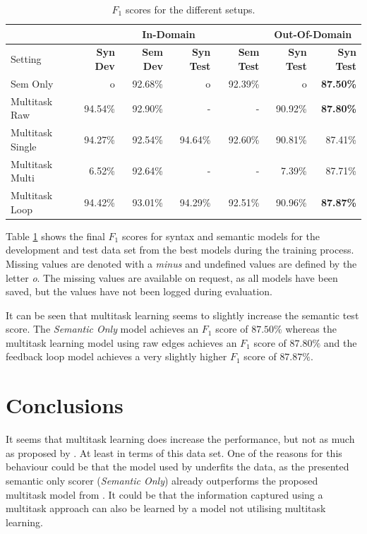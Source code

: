 \documentclass[11pt]{scrartcl}
\begin{document}
\begin{table}[h]
    \centering
    \begin{tabular}{l|r|r|r|r|r|r}
         & \multicolumn{4}{c}{In-Domain} & \multicolumn{2}{c}{Out-Of-Domain} \\ \hline
        Setting & \textbf{Syn Dev} & \textbf{Sem Dev} & \textbf{Syn Test} & \textbf{Sem Test} & \textbf{Syn Test} & \textbf{Syn Test} \\ \hline
        Sem Only & o & 92.68\% &o & 92.39\% & o & \textbf{87.50\%} \\ 
        Multitask Raw & 94.54\% & 92.90\% & - & - & 90.92\% & \textbf{87.80\%} \\
        Multitask Single & 94.27\% & 92.54\% & 94.64\% & 92.60\% & 90.81\% & 87.41\% \\
        Multitask Multi & 6.52\% & 92.64\% & - & - & 7.39\% & 87.71\% \\
        Multitask Loop & 94.42\% & 93.01\% & 94.29\% & 92.51\% & 90.96\% & \textbf{87.87\%} \\
    \end{tabular}
    \caption{$F_1$ scores for the different setups.}
    \label{tab:results}
\end{table}

Table \ref{tab:results} shows the final $F_1$ scores for syntax and semantic models for the development and test data set from the best models during the training process. Missing values are denoted with a \textit{minus} and undefined values are defined by the letter \textit{o}. The missing values are available on request, as all models have been saved, but the values have not been logged during evaluation.

It can be seen that multitask learning seems to slightly increase the semantic test score. The \textit{Semantic Only} model achieves an $F_1$ score of $87.50\%$ whereas the multitask learning model using raw edges achieves an $F_1$ score of $87.80\%$ and the feedback loop model achieves a very slightly higher $F_1$ score of $87.87\%$.

\section{Conclusions}

It seems that multitask learning does increase the performance, but not as much as proposed by \cite{peng-etal-2017-deep}. At least in terms of this data set. One of the reasons for this behaviour could be that the model used by \cite{peng-etal-2017-deep} underfits the data, as the presented semantic only scorer (\textit{Semantic Only}) already outperforms the proposed multitask model from \cite{peng-etal-2017-deep}. It could be that the information captured using a multitask approach can also be learned by a model not utilising multitask learning.
\end{document}
